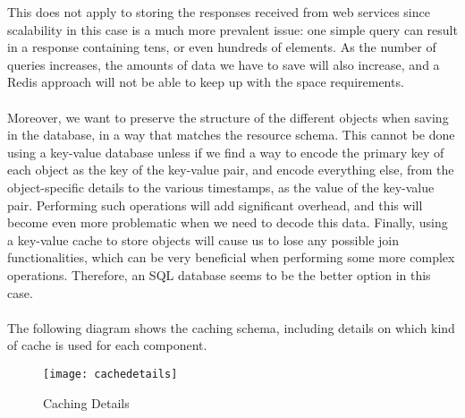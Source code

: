 This does not apply to storing the responses received from web services since scalability in this case is a much more prevalent issue: one simple query can result in a response containing tens, or even hundreds of elements. As the number of queries increases, the amounts of data we have to save will also increase, and a Redis approach will not be able to keep up with the space requirements.\\\\
Moreover, we want to preserve the structure of the different objects when saving in the database, in a way that matches the resource schema. This cannot be done using a key-value database unless if we find a way to encode the primary key of each object as the key of the key-value pair, and encode everything else, from the object-specific details to the various timestamps, as the value of the key-value pair. Performing such operations will add significant overhead, and this will become even more problematic when we need to decode this data. Finally, using a key-value cache to store objects will cause us to lose any possible join functionalities, which can be very beneficial when performing some more complex operations. Therefore, an SQL database seems to be the better option in this case.\\\\
The following diagram shows the caching schema, including details on which kind of cache is used for each component.
\begin{figure}[h]
\centering
\texttt{[image: cachedetails]}
\caption{Caching Details}
\end{figure}
\newpage
